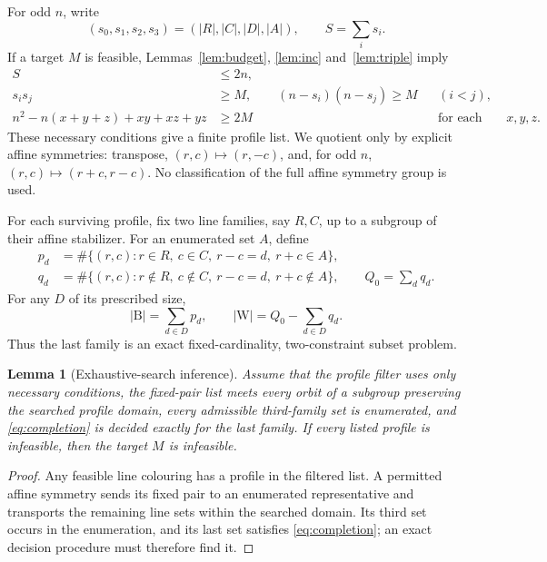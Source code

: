 \documentclass[11pt]{amsart}
\newtheorem{lemma}[theorem]{Lemma}
\theoremstyle{definition}
\theoremstyle{remark}
\newcommand{\Bl}{\mathrm{B}}
\newcommand{\Wh}{\mathrm{W}}
\begin{document}
For odd $n$, write
\[
(s_0,s_1,s_2,s_3)=(|R|,|C|,|D|,|A|),\qquad S=\sum_i s_i.
\]
If a target $M$ is feasible, Lemmas~\ref{lem:budget},
\ref{lem:inc} and~\ref{lem:triple} imply
\begin{align}
S&\le2n,\label{eq:oddprofile1}\\
s_is_j&\ge M,\qquad (n-s_i)(n-s_j)\ge M
&& (i<j),\label{eq:oddprofile2}\\
n^2-n(x+y+z)+xy+xz+yz&\ge2M
&&\text{for each triple }x,y,z.\label{eq:oddprofile3}
\end{align}
These necessary conditions give a finite profile list.  We quotient only by
explicit affine symmetries: transpose, $(r,c)\mapsto(r,-c)$, and, for odd
$n$, $(r,c)\mapsto(r+c,r-c)$.  No classification of the full affine
symmetry group is used.

For each surviving profile, fix two line families, say $R,C$, up to a
subgroup of their affine stabilizer.  For an enumerated set $A$, define
\[
\begin{aligned}
p_d&=\#\{(r,c):r\in R,\ c\in C,\ r-c=d,\ r+c\in A\},\\
q_d&=\#\{(r,c):r\notin R,\ c\notin C,\ r-c=d,\ r+c\notin A\},\qquad
Q_0=\sum_d q_d .
\end{aligned}
\]
For any $D$ of its prescribed size,
\begin{equation}\label{eq:completion}
|\Bl|=\sum_{d\in D}p_d,\qquad
|\Wh|=Q_0-\sum_{d\in D}q_d.
\end{equation}
Thus the last family is an exact fixed-cardinality, two-constraint subset
problem.

\begin{lemma}[Exhaustive-search inference]\label{lem:searchsound}
Assume that the profile filter uses only necessary conditions, the fixed-pair
list meets every orbit of a subgroup preserving the searched profile domain,
every admissible third-family set is enumerated, and
\eqref{eq:completion} is decided exactly for the last family.  If every
listed profile is infeasible, then the target $M$ is infeasible.
\end{lemma}

\begin{proof}
Any feasible line colouring has a profile in the filtered list.  A permitted
affine symmetry sends its fixed pair to an enumerated representative and
transports the remaining line sets within the searched domain.  Its third
set occurs in the enumeration, and its last set satisfies
\eqref{eq:completion}; an exact decision procedure must therefore find it.
\end{proof}
\end{document}

